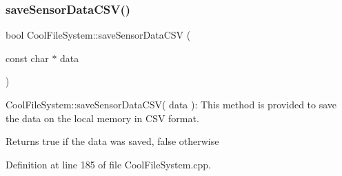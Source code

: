 \subsubsection{\texorpdfstring{save\+Sensor\+Data\+C\+S\+V()}{saveSensorDataCSV()}}
{\footnotesize\ttfamily bool Cool\+File\+System\+::save\+Sensor\+Data\+C\+SV (\begin{DoxyParamCaption}\item[{const char $\ast$}]{data }\end{DoxyParamCaption})}

Cool\+File\+System\+::save\+Sensor\+Data\+C\+S\+V( data )\+: This method is provided to save the data on the local memory in C\+SV format.

\begin{DoxyReturn}{Returns}
true if the data was saved, false otherwise 
\end{DoxyReturn}


Definition at line 185 of file Cool\+File\+System.\+cpp.


